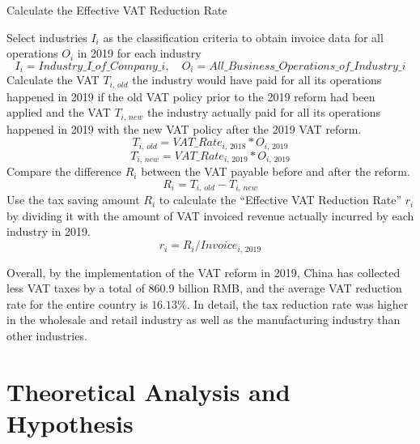 \documentclass[3p,times]{elsarticle}
\begin{document}
\begin{algorithm}[htp!]
\caption{{\color{red} Calculate the Effective VAT Reduction Rate}}
\begin{algorithmic}[1]
\State Select industries $I_i$ as the classification criteria to obtain invoice data for all operations  $O_i$ in 2019 for each industry
\begin{equation*}
    I_{i} = Industry\_I\_of\_Company\_ i,\quad O_{i} = All\_Business\_ Operations\_of\_Industry\_i 
\end{equation*}
\State Calculate the VAT $T_{i,\, old}$ the industry would have paid for all its operations happened in 2019 if the old VAT policy prior to the 2019 reform had been applied and the VAT $T_{i,\, new}$ the industry actually paid for all its operations happened in 2019 with the new VAT policy after the 2019 VAT reform.
\begin{equation*}
    T_{i,\, old} = VAT\_Rate_{i,\,2018}*O_{i,\, 2019}
\end{equation*}
\begin{equation*}
    T_{i,\, new} = VAT\_Rate_{i,\,2019}*O_{i,\, 2019}
\end{equation*}
\State Compare the difference $R_i$ between the VAT payable before and after the reform.
\begin{equation*}
    R_i = T_{i,\, old} - T_{i,\, new}
\end{equation*}
\State Use the tax saving amount $R_i$ to calculate the “Effective VAT Reduction Rate” $r_i$ by dividing it with the amount of VAT invoiced revenue actually incurred by each industry in 2019.
\begin{equation*}
    r_i = R_i / Invoice_{i,\,2019}
\end{equation*}
\end{algorithmic}\label{VAT_reduction_rate}
\end{algorithm}

Overall, by the implementation of the VAT reform in 2019, China has collected less VAT taxes by a total of $860.9$ billion RMB, and the average VAT reduction rate for the entire country is $16.13\%$. In detail, the tax reduction rate was higher in the wholesale and retail industry as well as the manufacturing industry than other industries. 

\section{Theoretical Analysis and Hypothesis}
\end{document}

